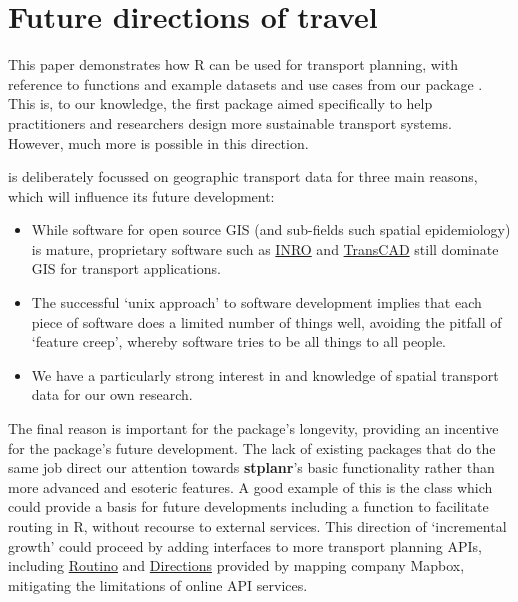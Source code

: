 \section{Future directions of travel}\label{future-directions-of-travel}

This paper demonstrates how R can be used for transport planning, with reference to functions and example datasets and use cases from our package .
This is, to our knowledge, the first package aimed specifically to help practitioners and researchers design more sustainable transport systems.
However, much more is possible in this direction.

 is deliberately focussed on geographic transport data for three main reasons, which will influence its future development:

\begin{itemize}
\tightlist
  \item While software for open source GIS (and sub-fields such spatial epidemiology) is mature,  proprietary software such as \href{https://www.inrosoftware.com/en/products/emme/}{INRO} and  \href{http://www.caliper.com/tcovu.htm}{TransCAD} still dominate GIS for transport applications.
  \item The successful `unix approach' to software development implies that each piece of software does a limited number of things well, avoiding the pitfall of `feature creep', whereby software tries to be all things to all people.
  \item We have a particularly strong interest in and knowledge of spatial transport data for our own research.
\end{itemize}

The final reason is important for the package's longevity, providing an incentive for the package's future development.
The lack of existing packages that do the same job direct our attention towards \textbf{stplanr}'s basic functionality rather than more advanced and esoteric features.
A good example of this is the  class which could provide a basis for future developments including a  function to facilitate routing in R, without recourse to external services.
This direction of `incremental growth' could proceed by adding interfaces to more transport planning APIs, including \href{https://www.routino.org/uk/}{Routino} and \href{https://www.mapbox.com/directions/}{Directions} provided by mapping company Mapbox, mitigating the limitations of online API services.

